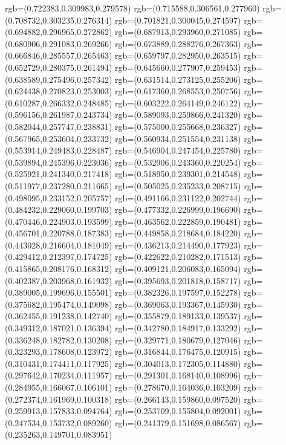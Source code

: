 {{{			rgb=(0.722383,0.309983,0.279578)
			rgb=(0.715588,0.306561,0.277960)
			rgb=(0.708732,0.303235,0.276314)
			rgb=(0.701821,0.300045,0.274597)
			rgb=(0.694882,0.296965,0.272862)
			rgb=(0.687913,0.293960,0.271085)
			rgb=(0.680906,0.291083,0.269266)
			rgb=(0.673889,0.288276,0.267363)
			rgb=(0.666846,0.285557,0.265463)
			rgb=(0.659797,0.282950,0.263515)
			rgb=(0.652729,0.280375,0.261494)
			rgb=(0.645660,0.277907,0.259453)
			rgb=(0.638589,0.275496,0.257342)
			rgb=(0.631514,0.273125,0.255206)
			rgb=(0.624438,0.270823,0.253003)
			rgb=(0.617360,0.268553,0.250756)
			rgb=(0.610287,0.266332,0.248485)
			rgb=(0.603222,0.264149,0.246122)
			rgb=(0.596156,0.261987,0.243734)
			rgb=(0.589093,0.259866,0.241320)
			rgb=(0.582044,0.257747,0.238831)
			rgb=(0.575000,0.255668,0.236327)
			rgb=(0.567965,0.253604,0.233732)
			rgb=(0.560934,0.251554,0.231138)
			rgb=(0.553914,0.249483,0.228487)
			rgb=(0.546904,0.247454,0.225780)
			rgb=(0.539894,0.245396,0.223036)
			rgb=(0.532906,0.243360,0.220254)
			rgb=(0.525921,0.241340,0.217418)
			rgb=(0.518950,0.239301,0.214548)
			rgb=(0.511977,0.237280,0.211665)
			rgb=(0.505025,0.235233,0.208715)
			rgb=(0.498095,0.233152,0.205757)
			rgb=(0.491166,0.231122,0.202744)
			rgb=(0.484232,0.229060,0.199703)
			rgb=(0.477332,0.226999,0.196690)
			rgb=(0.470446,0.224903,0.193599)
			rgb=(0.463562,0.222859,0.190481)
			rgb=(0.456701,0.220788,0.187383)
			rgb=(0.449858,0.218684,0.184220)
			rgb=(0.443028,0.216604,0.181049)
			rgb=(0.436213,0.214490,0.177923)
			rgb=(0.429412,0.212397,0.174725)
			rgb=(0.422622,0.210282,0.171513)
			rgb=(0.415865,0.208176,0.168312)
			rgb=(0.409121,0.206083,0.165094)
			rgb=(0.402387,0.203968,0.161932)
			rgb=(0.395693,0.201818,0.158717)
			rgb=(0.389005,0.199696,0.155501)
			rgb=(0.382326,0.197597,0.152278)
			rgb=(0.375682,0.195474,0.149098)
			rgb=(0.369063,0.193367,0.145930)
			rgb=(0.362455,0.191238,0.142740)
			rgb=(0.355879,0.189133,0.139537)
			rgb=(0.349312,0.187021,0.136394)
			rgb=(0.342780,0.184917,0.133292)
			rgb=(0.336248,0.182782,0.130208)
			rgb=(0.329771,0.180679,0.127046)
			rgb=(0.323293,0.178608,0.123972)
			rgb=(0.316844,0.176475,0.120915)
			rgb=(0.310431,0.174411,0.117925)
			rgb=(0.304013,0.172305,0.114880)
			rgb=(0.297642,0.170234,0.111957)
			rgb=(0.291301,0.168140,0.108996)
			rgb=(0.284955,0.166067,0.106101)
			rgb=(0.278670,0.164036,0.103209)
			rgb=(0.272374,0.161969,0.100318)
			rgb=(0.266143,0.159860,0.097520)
			rgb=(0.259913,0.157833,0.094764)
			rgb=(0.253709,0.155804,0.092001)
			rgb=(0.247534,0.153732,0.089260)
			rgb=(0.241379,0.151698,0.086567)
			rgb=(0.235263,0.149701,0.083951)
}}}
